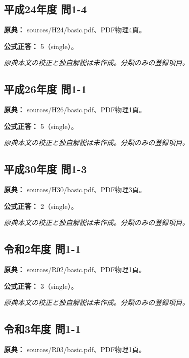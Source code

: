 \subsection{平成24年度 問1-4}
\label{q:h24-reg-basic-1-4}

\noindent\textbf{原典：} sources/H24/basic.pdf、PDF物理4頁。

\textbf{公式正答：} 5（single）。

\par\textit{原典本文の校正と独自解説は未作成。分類のみの登録項目。}

\subsection{平成26年度 問1-1}
\label{q:h26-reg-basic-1-1}

\noindent\textbf{原典：} sources/H26/basic.pdf、PDF物理1頁。

\textbf{公式正答：} 5（single）。

\par\textit{原典本文の校正と独自解説は未作成。分類のみの登録項目。}

\subsection{平成30年度 問1-3}
\label{q:h30-reg-basic-1-3}

\noindent\textbf{原典：} sources/H30/basic.pdf、PDF物理3頁。

\textbf{公式正答：} 2（single）。

\par\textit{原典本文の校正と独自解説は未作成。分類のみの登録項目。}

\subsection{令和2年度 問1-1}
\label{q:r02-reg-basic-1-1}

\noindent\textbf{原典：} sources/R02/basic.pdf、PDF物理1頁。

\textbf{公式正答：} 3（single）。

\par\textit{原典本文の校正と独自解説は未作成。分類のみの登録項目。}

\subsection{令和3年度 問1-1}
\label{q:r03-reg-basic-1-1}

\noindent\textbf{原典：} sources/R03/basic.pdf、PDF物理1頁。

